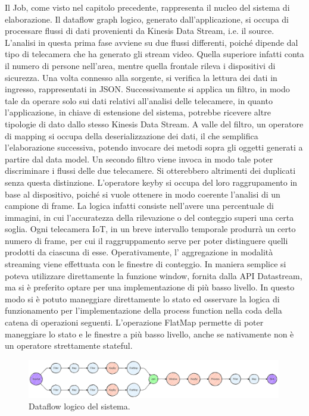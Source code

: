 Il Job, come visto nel capitolo precedente, rappresenta il nucleo del sistema di elaborazione. Il dataflow graph logico, generato dall'applicazione, si occupa di processare flussi di dati provenienti da Kinesis Data Stream, i.e. il source. L'analisi in questa prima fase avviene su due flussi differenti, poiché  dipende dal tipo di telecamera che ha generato gli stream video. Quella superiore infatti conta il numero di persone nell'area, mentre quella frontale rileva i dispositivi di sicurezza. Una volta connesso alla sorgente, si verifica la lettura dei dati in ingresso, rappresentati in JSON. Successivamente si applica un filtro, in modo tale da operare solo sui dati relativi all'analisi delle telecamere, in quanto l'applicazione, in chiave di estensione del sistema, potrebbe ricevere altre tipologie di dato dallo stesso Kinesis Data Stream. A valle del filtro, un operatore di mapping si occupa della deserializzazione dei dati, il che semplifica l'elaborazione successiva, potendo invocare dei metodi sopra gli oggetti generati a partire dal data model. Un secondo filtro viene invoca in modo tale poter discriminare i flussi delle due telecamere. Si otterebbero altrimenti dei duplicati senza questa distinzione. L'operatore keyby si occupa del loro raggrupamento in base al dispositivo, poiché si vuole ottenere in modo coerente l'analisi di un campione di frame. La logica infatti consiste nell'avere una percentuale di immagini, in cui l'accuratezza della rilevazione o del conteggio superi una certa soglia. Ogni telecamera IoT, in un breve intervallo temporale produrrà un certo numero di frame, per cui il raggruppamento serve per poter distinguere quelli prodotti da ciascuna di esse. Operativamente, l' aggregazione in modalità streaming viene effettuata con le finestre di conteggio. In maniera semplice si poteva utilizzare direttamente la funzione window, fornita dalla API Datastream, ma si è preferito optare per una implementazione di più basso livello. In questo modo si è potuto maneggiare direttamente lo stato ed osservare la logica di funzionamento per l'implementazione della process function nella coda della catena di operazioni seguenti. L'operazione FlatMap permette di poter maneggiare lo stato e le finestre a più basso livello, anche se nativamente non è un operatore strettamente stateful. 

\begin{figure}[htbp]
    \centering
    \includegraphics[width=0.99\textwidth]{figures/system-logical-dataflow-graph.png}
    \caption{Dataflow logico del sistema.} 
    \label{fig:system-dataflow}
\end{figure}

